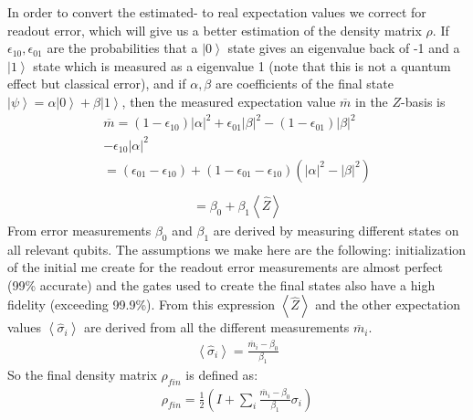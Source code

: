 In order to convert the estimated- to real expectation values we correct for readout error, which will give us a better estimation of the density matrix $\rho$. If $\epsilon_{10},\epsilon_{01}$ are the probabilities that a $\left|0\right\rangle$ state gives an eigenvalue back of -1 and a $\left|1\right\rangle$ state which is measured as a eigenvalue 1 (note that this is not a quantum effect but classical error), and if $\alpha,\beta$ are coefficients of the final state $\left|\psi\right\rangle=\alpha\left|0\right\rangle+\beta\left|1\right\rangle$, then the measured expectation value $\overline{m}$ in the $Z$-basis is
\begin{equation*}
\begin{split}
\overline{m} =\left(1-\epsilon_{10}\right)\left|\alpha\right|^2+\epsilon_{01}\left|\beta\right|^2-\left(1-\epsilon_{01}\right)\left|\beta\right|^2\\
-\epsilon_{10}\left|\alpha\right|^2\\=\left(\epsilon_{01}-\epsilon_{10}\right)+\left(1-\epsilon_{01}-\epsilon_{10}\right)\left(\left|\alpha\right|^2-\left|\beta\right|^2\right)\\
\end{split}
\end{equation*}
\begin{equation}
\begin{split}
=\beta_0+\beta_1\left\langle \hat{Z}\right\rangle
\end{split}
\end{equation}
From error measurements $\beta_0$ and $\beta_1$ are derived by measuring different states on all relevant qubits. The assumptions we make here are the following: initialization of the initial me create for the readout error measurements are almost perfect (99\% accurate) and the gates used to create the final states also have a high fidelity (exceeding 99.9\%).
From this expression $\left\langle \hat{Z}\right\rangle$ and the other expectation values $\left\langle \hat{\sigma}_i\right\rangle$ are derived from all the different measurements $\overline{m}_i$.
\begin{equation}
\begin{split}
\left\langle \hat{\sigma}_i\right\rangle=\frac{\overline{m}_i-\beta_0}{\beta_1}
\end{split}
\end{equation}
So the final density matrix $\rho_{fin}$ is defined as:
\begin{equation}
\begin{split}
\rho_{fin}=\frac{1}{2}\left(I+\sum_i\frac{\overline{m}_i-\beta_0}{\beta_1}\sigma_i\right)
\end{split}
\end{equation}
